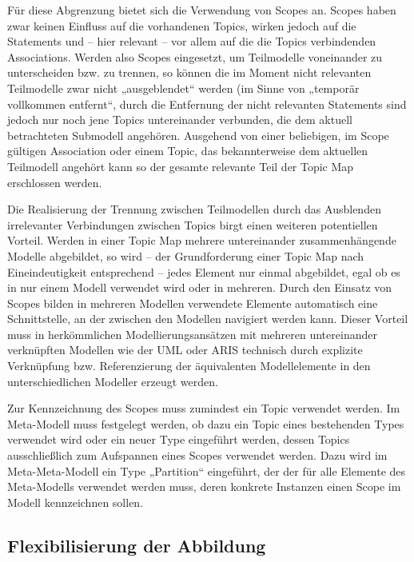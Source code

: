 Für diese Abgrenzung bietet sich die Verwendung von Scopes an. Scopes haben zwar keinen Einfluss auf die vorhandenen Topics, wirken jedoch auf die Statements und -- hier relevant -- vor allem auf die die Topics verbindenden Associations. Werden also Scopes eingesetzt, um Teilmodelle voneinander zu unterscheiden bzw. zu trennen, so können die im Moment nicht relevanten Teilmodelle zwar nicht „ausgeblendet“ werden (im Sinne von „temporär vollkommen entfernt“, durch die Entfernung der nicht relevanten Statements sind jedoch nur noch jene Topics untereinander verbunden, die dem aktuell betrachteten Submodell angehören. Ausgehend von einer beliebigen, im Scope gültigen Association oder einem Topic, das bekannterweise dem aktuellen Teilmodell angehört kann so der gesamte relevante Teil der Topic Map erschlossen werden.

Die Realisierung der Trennung zwischen Teilmodellen durch das Ausblenden irrelevanter Verbindungen zwischen Topics birgt einen weiteren potentiellen Vorteil. Werden in einer Topic Map mehrere untereinander zusammenhängende Modelle abgebildet, so wird -- der Grundforderung einer Topic Map nach Eineindeutigkeit entsprechend -- jedes Element nur einmal abgebildet, egal ob es in nur einem Modell verwendet wird oder in mehreren. Durch den Einsatz von Scopes bilden in mehreren Modellen verwendete Elemente automatisch eine Schnittstelle, an der zwischen den Modellen navigiert werden kann. Dieser Vorteil muss in herkömmlichen Modellierungsansätzen mit mehreren untereinander verknüpften Modellen wie der UML \citep{Rumbaugh04} oder ARIS \citep{Scheer03} technisch durch explizite Verknüpfung bzw. Referenzierung der äquivalenten Modellelemente in den unterschiedlichen Modeller erzeugt werden. 

Zur Kennzeichnung des Scopes muss zumindest ein Topic verwendet werden. Im Meta-Modell muss festgelegt werden, ob dazu ein Topic eines bestehenden Types verwendet wird oder ein neuer Type eingeführt werden, dessen Topics ausschließlich zum Aufspannen eines Scopes verwendet werden. Dazu wird im Meta-Meta-Modell ein Type „Partition“ eingeführt, der der für alle Elemente des Meta-Modells verwendet werden muss, deren konkrete Instanzen einen Scope im Modell kennzeichnen sollen.


\subsection{Flexibilisierung der Abbildung}
\label{sub:flexibilisierung_der_abbildung}

